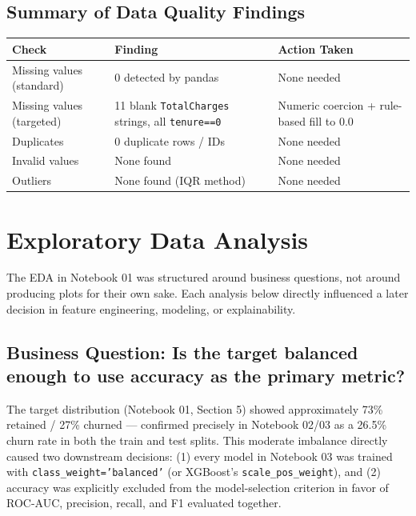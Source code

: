 \documentclass[11pt]{article}
\newcommand{\artifact}[1]{\texttt{\color{navy}#1}}
\begin{document}
\subsection{Summary of Data Quality Findings}

\begin{center}
\begin{tabularx}{\textwidth}{@{}l X X@{}}
\toprule
\textbf{Check} & \textbf{Finding} & \textbf{Action Taken} \\
\midrule
Missing values (standard) & 0 detected by pandas & None needed \\
Missing values (targeted) & 11 blank \artifact{TotalCharges} strings, all \texttt{tenure==0} & Numeric coercion + rule-based fill to 0.0 \\
Duplicates & 0 duplicate rows / IDs & None needed \\
Invalid values & None found & None needed \\
Outliers & None found (IQR method) & None needed \\
\bottomrule
\end{tabularx}
\end{center}

\section{Exploratory Data Analysis}

The EDA in Notebook 01 was structured around business questions, not around producing plots for their own sake. Each analysis below directly influenced a later decision in feature engineering, modeling, or explainability.

\subsection{Business Question: Is the target balanced enough to use accuracy as the primary metric?}

The target distribution (Notebook 01, Section 5) showed approximately 73\% retained / 27\% churned --- confirmed precisely in Notebook 02/03 as a 26.5\% churn rate in both the train and test splits. This moderate imbalance directly caused two downstream decisions: (1) every model in Notebook 03 was trained with \texttt{class\_weight='balanced'} (or XGBoost's \texttt{scale\_pos\_weight}), and (2) accuracy was explicitly excluded from the model-selection criterion in favor of ROC-AUC, precision, recall, and F1 evaluated together.
\end{document}
